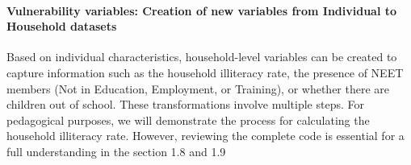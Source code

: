 \documentclass[
]{article}
\newenvironment{Shaded}{\begin{snugshade}}{\end{snugshade}}
\newcommand{\AttributeTok}[1]{\textcolor[rgb]{0.13,0.29,0.53}{#1}}
\newcommand{\DecValTok}[1]{\textcolor[rgb]{0.00,0.00,0.81}{#1}}
\newcommand{\FunctionTok}[1]{\textcolor[rgb]{0.13,0.29,0.53}{\textbf{#1}}}
\newcommand{\NormalTok}[1]{#1}
\newcommand{\OtherTok}[1]{\textcolor[rgb]{0.56,0.35,0.01}{#1}}
\newcommand{\SpecialCharTok}[1]{\textcolor[rgb]{0.81,0.36,0.00}{\textbf{#1}}}
\newcommand{\StringTok}[1]{\textcolor[rgb]{0.31,0.60,0.02}{#1}}
\begin{document}
\begin{Shaded}
\end{Shaded}

\paragraph{Vulnerability variables: Creation of new variables from
Individual to Household
datasets}\label{vulnerability-variables-creation-of-new-variables-from-individual-to-household-datasets}

Based on individual characteristics, household-level variables can be
created to capture information such as the household illiteracy rate,
the presence of NEET members (Not in Education, Employment, or
Training), or whether there are children out of school. These
transformations involve multiple steps. For pedagogical purposes, we
will demonstrate the process for calculating the household illiteracy
rate. However, reviewing the complete code is essential for a full
understanding in the section 1.8 and 1.9
\end{document}
